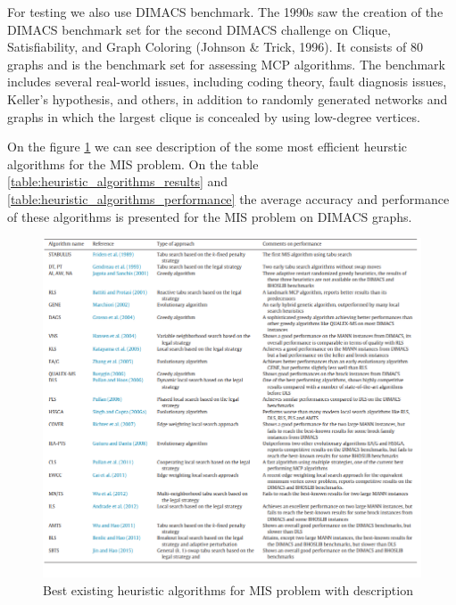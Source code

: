 For testing we also use DIMACS benchmark. The 1990s saw the creation of the DIMACS benchmark set for the second DIMACS challenge on Clique, Satisfiability, and Graph Coloring (Johnson \& Trick, 1996). It consists of 80 graphs and is the benchmark set for assessing MCP algorithms. The benchmark includes several real-world issues, including coding theory, fault diagnosis issues, Keller's hypothesis, and others, in addition to randomly generated networks and graphs in which the largest clique is concealed by using low-degree vertices.

On the figure \ref{fig:heuristic_algorithms_description} we can see description of the some most efficient heurstic algorithms for the MIS problem. On the table \ref{table:heuristic_algorithms_results} and \ref{table:heuristic_algorithms_performance} the average accuracy and performance of these algorithms is presented for the MIS problem on DIMACS graphs.
\begin{figure}[h]
    \centering
    \includegraphics{figures/heuristic_algorithms_description.png}
    \caption{Best existing heuristic algorithms for MIS problem with description}
    \label{fig:heuristic_algorithms_description}
\end{figure}


